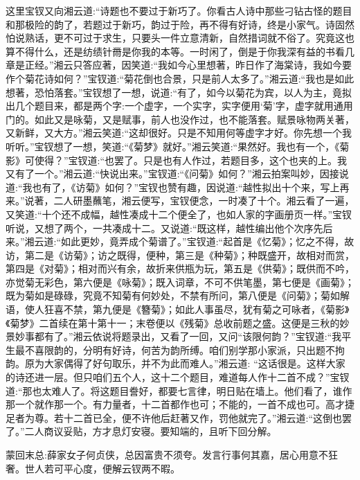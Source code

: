 \begin{parag}
    这里宝钗又向湘云道:“诗题也不要过于新巧了。你看古人诗中那些刁钻古怪的题目和那极险的韵了，若题过于新巧，韵过于险，再不得有好诗，终是小家气。诗固然怕说熟话，更不可过于求生，只要头一件立意清新，自然措词就不俗了。究竟这也算不得什么，还是纺绩针黹是你我的本等。一时闲了，倒是于你我深有益的书看几章是正经。”湘云只答应著，因笑道:“我如今心里想著，昨日作了海棠诗，我如今要作个菊花诗如何？”宝钗道:“菊花倒也合景，只是前人太多了。”湘云道:“我也是如此想著，恐怕落套。”宝钗想了一想，说道:“有了，如今以菊花为宾，以人为主，竟拟出几个题目来，都是两个字:一个虚字，一个实字，实字便用‘菊’字，虚字就用通用门的。如此又是咏菊，又是赋事，前人也没作过，也不能落套。赋景咏物两关著，又新鲜，又大方。”湘云笑道:“这却很好。只是不知用何等虚字才好。你先想一个我听听。”宝钗想了一想，笑道:“《菊梦》就好。”湘云笑道:“果然好。我也有一个，《菊影》可使得？”宝钗道:“也罢了。只是也有人作过，若题目多，这个也夹的上。我又有了一个。”湘云道:“快说出来。”宝钗道:“《问菊》如何？”湘云拍案叫妙，因接说道:“我也有了，《访菊》如何？”宝钗也赞有趣，因说道:“越性拟出十个来，写上再来。”说著，二人研墨蘸笔，湘云便写，宝钗便念，一时凑了十个。湘云看了一遍，又笑道:“十个还不成幅，越性凑成十二个便全了，也如人家的字画册页一样。”宝钗听说，又想了两个，一共凑成十二。又说道:“既这样，越性编出他个次序先后来。”湘云道:“如此更妙，竟弄成个菊谱了。”宝钗道:“起首是《忆菊》；忆之不得，故访，第二是《访菊》；访之既得，便种，第三是《种菊》；种既盛开，故相对而赏，第四是《对菊》；相对而兴有余，故折来供瓶为玩，第五是《供菊》；既供而不吟，亦觉菊无彩色，第六便是《咏菊》；既入词章，不可不供笔墨，第七便是《画菊》；既为菊如是碌碌，究竟不知菊有何妙处，不禁有所问，第八便是《问菊》；菊如解语，使人狂喜不禁，第九便是《簪菊》；如此人事虽尽，犹有菊之可咏者，《菊影》《菊梦》二首续在第十第十一；末卷便以《残菊》总收前题之盛。这便是三秋的妙景妙事都有了。”湘云依说将题录出，又看了一回，又问“该限何韵？”宝钗道:“我平生最不喜限韵的，分明有好诗，何苦为韵所缚。咱们别学那小家派，只出题不拘韵。原为大家偶得了好句取乐，并不为此而难人。”湘云道: “这话很是。这样大家的诗还进一层。但只咱们五个人，这十二个题目，难道每人作十二首不成？”宝钗道:“那也太难人了。将这题目誊好，都要七言律，明日贴在墙上。他们看了，谁作那一个就作那一个。有力量者，十二首都作也可；不能的，一首不成也可。高才捷足者为尊。若十二首已全，便不许他后赶著又作，罚他就完了。”湘云道:“这倒也罢了。”二人商议妥贴，方才息灯安寝。要知端的，且听下回分解。
\end{parag}


\begin{parag}
    \begin{note}蒙回末总:薛家女子何贞侠，总因富贵不须夸。发言行事何其嘉，居心用意不狂奢。世人若可平心度，便解云钗两不暇。\end{note}
\end{parag}

